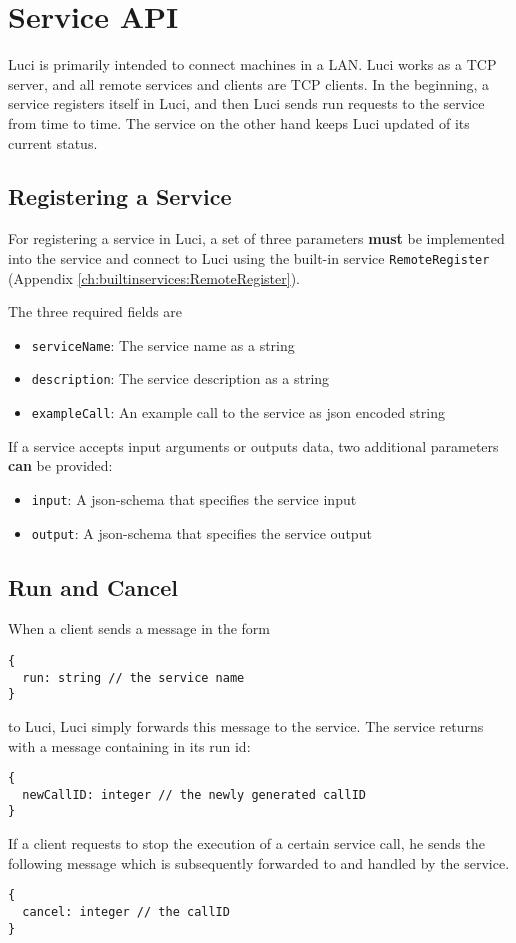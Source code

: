 \section{Service API}
\label{ch:serviceapi}

Luci is primarily intended to connect machines in a LAN. Luci works as a TCP server, and all remote services and clients are TCP clients. In the beginning, a service registers itself in Luci, and then Luci sends run requests to the service from time to time. The service on the other hand keeps Luci updated of its current status.

\subsection{Registering a Service}

For registering a service in Luci, a set of three parameters \textbf{must} be implemented into the service and connect to Luci using the built-in service \texttt{RemoteRegister} (Appendix \ref{ch:builtinservices:RemoteRegister}).

The three required fields are
\begin{itemize}
  \item \texttt{serviceName}: The service name as a string
  \item \texttt{description}: The service description as a string
  \item \texttt{exampleCall}: An example call to the service as json encoded string
\end{itemize}

If a service accepts input arguments or outputs data, two additional parameters \textbf{can} be provided:
\begin{itemize}
  \item \texttt{input}: A json-schema that specifies the service input
  \item \texttt{output}: A json-schema that specifies the service output
\end{itemize}

\subsection{Run and Cancel}
When a client sends a message in the form
\begin{lstlisting}
{
  run: string // the service name
}
\end{lstlisting}
to Luci, Luci simply forwards this message to the service. The service returns with a message containing in its run id:
\begin{lstlisting}
{
  newCallID: integer // the newly generated callID
}
\end{lstlisting}
If a client requests to stop the execution of a certain service call, he sends the following message which is subsequently forwarded to and handled by the service.
\begin{lstlisting}
{
  cancel: integer // the callID
}
\end{lstlisting}



